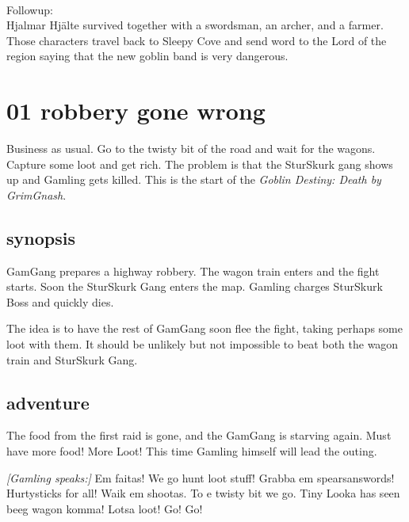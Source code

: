 \

Followup: \\
Hjalmar Hjälte survived together with a swordsman, an archer, and a farmer. Those characters travel back to Sleepy Cove and send word to the Lord of the region saying that the new goblin band is very dangerous.




\newpage
\section*{01 robbery gone wrong}

Business as usual. Go to the twisty bit of the road and wait for the wagons. Capture some loot and get rich. The problem is that the SturSkurk gang shows up and Gamling gets killed. This is the start of the \emph{Goblin Destiny: Death by GrimGnash}.


\subsection*{synopsis}

GamGang prepares a highway robbery. The wagon train enters and the fight starts. Soon the SturSkurk Gang enters the map. Gamling charges SturSkurk Boss and quickly dies.

The idea is to have the rest of GamGang soon flee the fight, taking perhaps some loot with them. It should be unlikely but not impossible to beat both the wagon train and SturSkurk Gang.


\subsection*{adventure}

The food from the first raid is gone, and the GamGang is starving again. Must have more food! More Loot! This time Gamling himself will lead the outing.

\begin{readoutloud}
\emph{[Gamling speaks:]}
Em faitas! We go hunt loot stuff! Grabba em spearsanswords! Hurtysticks for all! Waik em shootas. To e twisty bit we go. Tiny Looka has seen beeg wagon komma! Lotsa loot! Go! Go!
\end{readoutloud}

